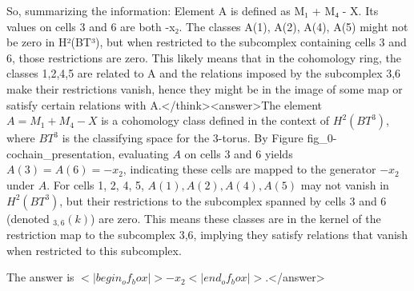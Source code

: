 So, summarizing the information: Element A is defined as M₁ + M₄ - X. Its values on cells 3 and 6 are both -x₂. The classes A(1), A(2), A(4), A(5) might not be zero in H²(BT³), but when restricted to the subcomplex containing cells 3 and 6, those restrictions are zero. This likely means that in the cohomology ring, the classes 1,2,4,5 are related to A and the relations imposed by the subcomplex {3,6} make their restrictions vanish, hence they might be in the image of some map or satisfy certain relations with A.</think><answer>The element \( A = M_1 + M_4 - X \) is a cohomology class defined in the context of \( H^2(BT^3) \), where \( BT^3 \) is the classifying space for the 3-torus. By Figure fig_0-cochain_presentation, evaluating \( A \) on cells 3 and 6 yields \( A(3) = A(6) = -x_2 \), indicating these cells are mapped to the generator \( -x_2 \) under \( A \). For cells 1, 2, 4, 5, \( A(1), A(2), A(4), A(5) \) may not vanish in \( H^2(BT^3) \), but their restrictions to the subcomplex spanned by cells 3 and 6 (denoted \( _{3,6}(k) \)) are zero. This means these classes are in the kernel of the restriction map to the subcomplex {3,6}, implying they satisfy relations that vanish when restricted to this subcomplex.  

The answer is \(<|begin_of_box|>-x_2<|end_of_box|>\).</answer>